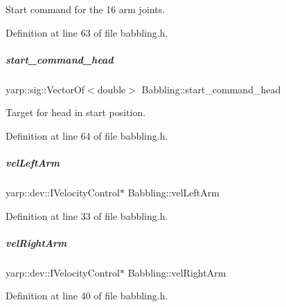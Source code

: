 Start command for the 16 arm joints. 



Definition at line 63 of file babbling.\+h.

\mbox{\label{group__babbling_ab713d81b43bcf7ae0e0b8dc2ad7dfd7f}} 
\subparagraph{\texorpdfstring{start\+\_\+command\+\_\+head}{start\_command\_head}}
{\footnotesize\ttfamily yarp\+::sig\+::\+Vector\+Of$<$double$>$ Babbling\+::start\+\_\+command\+\_\+head\hspace{0.3cm}{\ttfamily [protected]}}



Target for head in start position. 



Definition at line 64 of file babbling.\+h.

\mbox{\label{group__babbling_a3b87f9dd07393fb9f190bb8e4ced3662}} 
\subparagraph{\texorpdfstring{vel\+Left\+Arm}{velLeftArm}}
{\footnotesize\ttfamily yarp\+::dev\+::\+I\+Velocity\+Control$\ast$ Babbling\+::vel\+Left\+Arm\hspace{0.3cm}{\ttfamily [protected]}}



Definition at line 33 of file babbling.\+h.

\mbox{\label{group__babbling_a1f4d5e9370fad5b0637d759cada192f1}} 
\subparagraph{\texorpdfstring{vel\+Right\+Arm}{velRightArm}}
{\footnotesize\ttfamily yarp\+::dev\+::\+I\+Velocity\+Control$\ast$ Babbling\+::vel\+Right\+Arm\hspace{0.3cm}{\ttfamily [protected]}}



Definition at line 40 of file babbling.\+h.

